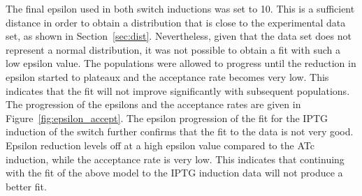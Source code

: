 The final epsilon used in both switch inductions was set to 10. This is a sufficient distance in order to obtain a distribution that is close to the experimental data set, as shown in Section~\ref{sec:dist}. Nevertheless, given that the data set does not represent a normal distribution, it was not possible to obtain a fit with such a low epsilon value. The populations were allowed to progress until the reduction in epsilon started to plateaux and the acceptance rate becomes very low. This indicates that the fit will not improve significantly with subsequent populations. The progression of the epsilons and the acceptance rates are given in Figure~\ref{fig:epsilon_accept}. The epsilon progression of the fit for the IPTG induction of the switch further confirms that the fit to the data is not very good. Epsilon reduction levels off at a high epsilon value compared to the ATc induction, while the acceptance rate is very low. This indicates that continuing with the fit of the above model to the IPTG induction data will not produce a better fit. 



